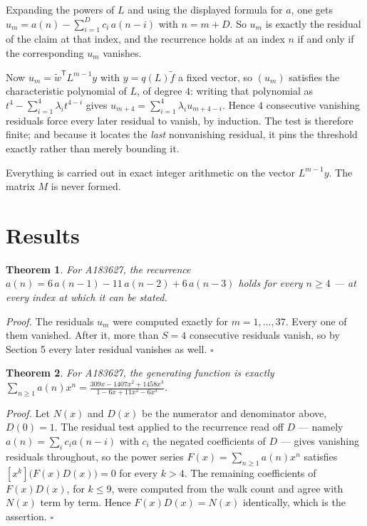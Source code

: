 \documentclass[11pt]{article}
\newtheorem{theorem}{Theorem}
\theoremstyle{definition}
\begin{document}
Expanding the powers of $L$ and using the displayed formula for $a$, one gets $u_m = a(n) - \sum_{i=1}^{D} c_i\,a(n-i)$ with $n = m + D$. So $u_m$ is exactly the residual of the claim at that index, and the recurrence holds at an index $n$ if and only if the corresponding $u_m$ vanishes.

Now $u_m = \tilde w^{\mathsf T} L^{m-1} y$ with $y = q(L)\tilde f$ a fixed vector, so $(u_m)$ satisfies the characteristic polynomial of $L$, of degree $4$: writing that polynomial as $t^{4} - \sum_{i=1}^{4} \lambda_i t^{4-i}$ gives $u_{m+4} = \sum_{i=1}^{4} \lambda_i u_{m+4-i}$. Hence $4$ consecutive vanishing residuals force every later residual to vanish, by induction. The test is therefore finite; and because it locates the {\itshape last} nonvanishing residual, it pins the threshold exactly rather than merely bounding it.

Everything is carried out in exact integer arithmetic on the vector $L^{m-1}y$. The matrix $M$ is never formed.

\section{Results}

\begin{theorem} For A183627, the recurrence $a(n) = 6\,a(n-1) - 11\,a(n-2) + 6\,a(n-3)$ holds for every $n \ge 4$ --- at every index at which it can be stated.\end{theorem}

{\itshape Proof.} The residuals $u_m$ were computed exactly for $m = 1,\dots,37$. Every one of them vanished. After it, more than $S = 4$ consecutive residuals vanish, so by Section 5 every later residual vanishes as well. $\square$

\begin{theorem} For A183627, the generating function is exactly $\sum_{n\ge 1} a(n)x^n = \frac{309x - 1407x^{2} + 1458x^{3}}{1 - 6x + 11x^{2} - 6x^{3}}$.\end{theorem}

{\itshape Proof.} Let $N(x)$ and $D(x)$ be the numerator and denominator above, $D(0)=1$. The residual test applied to the recurrence read off $D$ --- namely $a(n) = \sum_i c_i a(n-i)$ with $c_i$ the negated coefficients of $D$ --- gives vanishing residuals throughout, so the power series $F(x)=\sum_{n\ge 1}a(n)x^n$ satisfies $[x^k]\bigl(F(x)D(x)\bigr) = 0$ for every $k > 4$. The remaining coefficients of $F(x)D(x)$, for $k \le 9$, were computed from the walk count and agree with $N(x)$ term by term. Hence $F(x)D(x) = N(x)$ identically, which is the assertion. $\square$
\end{document}
